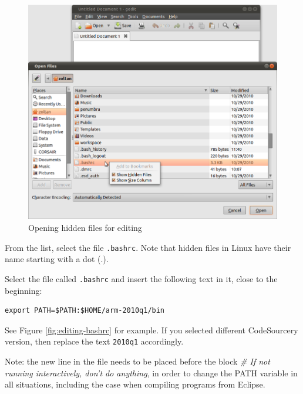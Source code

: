 \documentclass[a4paper, 10pt]{article}
\begin{document}
    \begin{figure}[H]
    \centering
        \includegraphics[width=\textwidth]{./install-guide-linux-images/show-all-files.png}
        \caption{Opening hidden files for editing}
        \label{fig:show-hidden-files}
    \end{figure}

From the list, select the file \verb+.bashrc+. Note that hidden files in Linux
have their name starting with a dot (.).

Select the file called \verb+.bashrc+ and insert the following text in it,
close to the beginning:

\begin{verbatim}
export PATH=$PATH:$HOME/arm-2010q1/bin
\end{verbatim}

See Figure \ref{fig:editing-bashrc} for example. If you selected different CodeSourcery version,
then replace the text \verb+2010q1+ accordingly.

Note: the new line in the file needs to be placed before the block
\emph{\# If not running interactively, don't do anything},
in order to change the PATH variable in all situations,
including the case when compiling programs from Eclipse.
\end{document}
